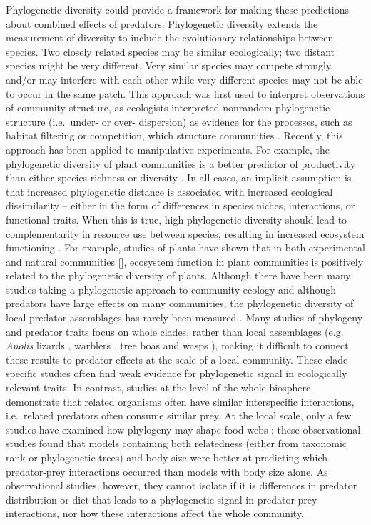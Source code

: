 Phylogenetic diversity could provide a framework for making these
predictions about combined effects of predators. Phylogenetic diversity
extends the measurement of diversity to include the evolutionary
relationships between species. Two closely related species may be
similar ecologically; two distant species might be very different. Very
similar species may compete strongly, and/or may interfere with each
other while very different species may not be able to occur in the same
patch. This approach was first used to interpret observations of
community structure, as ecologists interpreted nonrandom phylogenetic
structure (i.e.~under- or over- dispersion) as evidence for the
processes, such as habitat filtering or competition, which structure
communities \citep{Webb2002, Cavender-Bares2009}. Recently, this
approach has been applied to manipulative experiments. For example, the
phylogenetic diversity of plant communities is a better predictor of
productivity than either species richness or diversity
\citep[e.g.][]{Cadotte2009, Cadotte2008, Godoy2014}. In all cases, an
implicit assumption is that increased phylogenetic distance is
associated with increased ecological dissimilarity -- either in the form
of differences in species niches, interactions, or functional traits.
When this is true, high phylogenetic diversity should lead to
complementarity in resource use between species, resulting in increased
ecosystem functioning \citep{Srivastava2012c}. For example, studies of
plants have shown that in both experimental \citep{Cadotte2008} and
natural communities {[}{]}, ecosystem function in plant communities is
positively related to the phylogenetic diversity of plants. Although
there have been many studies taking a phylogenetic approach to community
ecology and although predators have large effects on many communities,
the phylogenetic diversity of local predator assemblages has rarely been
measured \citep{Bersier2008, Naisbit2011}. Many studies of phylogeny and
predator traits focus on whole clades, rather than local assemblages
(e.g. \emph{Anolis} lizards \citep{Knouft2006}, warblers
\citep{Bohning-Gaese2003}, tree boas \citep{Henderson2013} and wasps
\citep{Udriene2005}), making it difficult to connect these results to
predator effects at the scale of a local community. These clade specific
studies often find weak evidence for phylogenetic signal in ecologically
relevant traits. In contrast, studies at the level of the whole
biosphere \citep{Gomez2010, Bersier2008} demonstrate that related
organisms often have similar interspecific interactions, i.e.~related
predators often consume similar prey. At the local scale, only a few
studies have examined how phylogeny may shape food webs
\citep{Rezende2009, Cagnolo2011}; these observational studies found that
models containing both relatedness (either from taxonomic rank or
phylogenetic trees) and body size were better at predicting which
predator-prey interactions occurred than models with body size alone. As
observational studies, however, they cannot isolate if it is differences
in predator distribution or diet that leads to a phylogenetic signal in
predator-prey interactions, nor how these interactions affect the whole
community.

